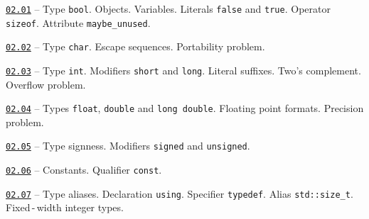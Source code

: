 \documentclass[a4paper,12pt]{article}
\renewenvironment{itemize}
{
    \begin{list}{\labelitemi}
    {
      \setlength{\topsep}{0pt}
      \setlength{\partopsep}{0pt}
      \setlength{\parskip}{0pt}
      \setlength{\itemsep}{0pt}
      \setlength{\parsep}{0pt}
      \setlength{\leftmargin}{14.5pt}
    }
}{\end{list}}
\begin{document}
\begin{itemize}
    
    \item \href{https://github.com/i-s-m-mipt/Education/blob/master/projects/examples/source/02.01.cpp}{\texttt{02.01}} -- Type \lstinline{bool}. Objects. Variables. Literals \lstinline{false} and \lstinline{true}. Operator \lstinline{sizeof}. Attribute \lstinline{maybe_unused}.

    \smallskip

    \item \href{https://github.com/i-s-m-mipt/Education/blob/master/projects/examples/source/02.02.cpp}{\texttt{02.02}} -- Type \lstinline{char}. Escape sequences. Portability problem.

    \smallskip

    \item \href{https://github.com/i-s-m-mipt/Education/blob/master/projects/examples/source/02.03.cpp}{\texttt{02.03}} -- Type \lstinline{int}. Modifiers \lstinline{short} and \lstinline{long}. Literal suffixes. Two's complement. Overflow problem.

    \smallskip
    
    \item \href{https://github.com/i-s-m-mipt/Education/blob/master/projects/examples/source/02.04.cpp}{\texttt{02.04}} -- Types \lstinline{float}, \lstinline{double} and \lstinline{long double}. Floating point formats. Precision problem.

    \smallskip

    \item \href{https://github.com/i-s-m-mipt/Education/blob/master/projects/examples/source/02.05.cpp}{\texttt{02.05}} -- Type signness. Modifiers \lstinline{signed} and \lstinline{unsigned}.

    \smallskip

    \item \href{https://github.com/i-s-m-mipt/Education/blob/master/projects/examples/source/02.06.cpp}{\texttt{02.06}} -- Constants. Qualifier \lstinline{const}.

    \smallskip

    \item \href{https://github.com/i-s-m-mipt/Education/blob/master/projects/examples/source/02.07.cpp}{\texttt{02.07}} -- Type aliases. Declaration \lstinline{using}. Specifier \lstinline{typedef}. Alias \lstinline{std::size_t}. Fixed\,-\,width integer types.
    
\end{itemize}
\end{document}
